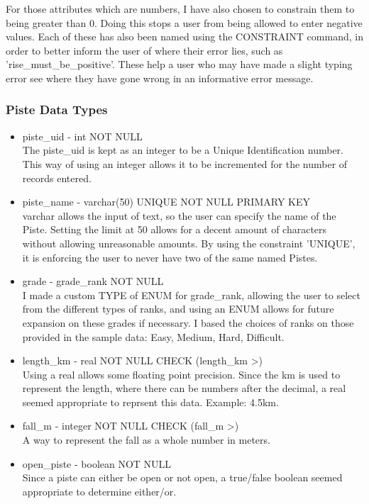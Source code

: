 \documentclass[11pt]{scrartcl} %
\begin{document}
For those attributes which are numbers, I have also chosen to constrain them to being greater than 0. Doing this stops a user from being allowed to enter negative values. Each of these has also been named using the CONSTRAINT command, in order to better inform the user of where their error lies, such as 'rise\_must\_be\_positive'. These help a user who may have made a slight typing error see where they have gone wrong in an informative error message.
\subsubsection{Piste Data Types}
\begin{itemize}
\item piste\_uid - int NOT NULL\\
The piste\_uid is kept as an integer to be a Unique Identification number. This way of using an integer allows it to be incremented for the number of records entered.
\item piste\_name - varchar(50) UNIQUE NOT NULL PRIMARY KEY\\
varchar allows the input of text, so the user can specify the name of the Piste. Setting the limit at 50 allows for a decent amount of characters without allowing unreasonable amounts. By using the constraint 'UNIQUE', it is enforcing the user to never have two of the same named Pistes.
\item grade - grade\_rank NOT NULL\\
I made a custom TYPE of ENUM for grade\_rank, allowing the user to select from the different types of ranks, and using an ENUM allows for future expansion on these grades if necessary. I based the choices of ranks on those provided in the sample data: Easy, Medium, Hard, Difficult.
\item length\_km - real NOT NULL CHECK (length\_km \textgreater {})\\
Using a real allows some floating point precision. Since the km is used to represent the length, where there can be numbers after the decimal, a real seemed appropriate to reprsent this data. Example: 4.5km.
\item fall\_m - integer NOT NULL CHECK (fall\_m \textgreater {})\\
A way to represent the fall as a whole number in meters.
\item open\_piste - boolean NOT NULL\\
Since a piste can either be open or not open, a true/false boolean seemed appropriate to determine either/or.
\end{itemize}
\end{document}
